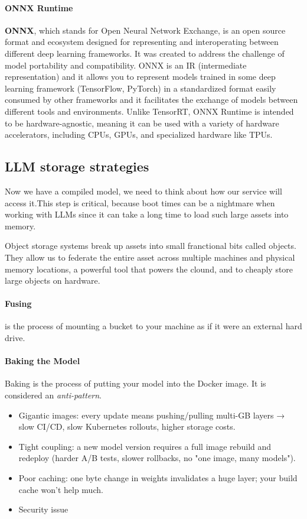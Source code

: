 \paragraph{ONNX Runtime}

\textbf{ONNX}, which stands for Open Neural Network Exchange, is an open source format and ecosystem designed for representing and interoperating between different deep learning frameworks. It was created to address the challenge of model portability and compatibility. ONNX is an IR (intermediate representation) and it allows you to represent models trained in some deep learning framework (\eg TensorFlow, PyTorch) in a standardized format easily consumed by other frameworks and it facilitates the exchange of models between different tools and environments. Unlike TensorRT, ONNX Runtime is intended to be hardware-agnostic, meaning it can be used with a variety of hardware accelerators, including CPUs, GPUs, and specialized hardware like TPUs. 

\subsection{LLM storage strategies}

Now we have a compiled model, we need to think about how our service will access it.This step is critical, because boot times can be a nightmare when working with LLMs since it can take a long time to load such large assets into memory.  

Object storage systems break up assets into small franctional bits called objects. They allow us to federate the entire asset across multiple machines and physical memory locations, a powerful tool that powers the clound, and to cheaply store large objects on hardware.  

\paragraph{Fusing} is the process of mounting a bucket to your machine as if it were an external hard drive. 

\paragraph{Baking the Model}

Baking is the process of putting your model into the Docker image. It is considered an \textit{anti-pattern}. 
\begin{itemize}
	\item Gigantic images: every update means pushing/pulling multi-GB layers → slow CI/CD, slow Kubernetes rollouts, higher storage costs.
	\item Tight coupling: a new model version requires a full image rebuild and redeploy (harder A/B tests, slower rollbacks, no "one image, many models").
	\item Poor caching: one byte change in weights invalidates a huge layer; your build cache won't help much.
	\item Security issue
\end{itemize}

